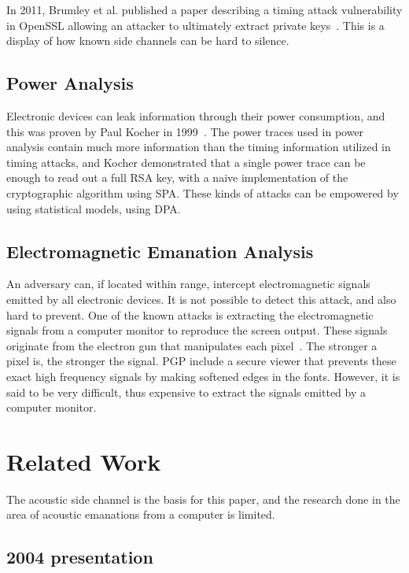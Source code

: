 In 2011, Brumley et al. published a paper describing a timing attack vulnerability in OpenSSL allowing an attacker to ultimately extract private keys~\cite{DBLP:conf/esorics/BrumleyT11}.
This is a display of how known side channels can be hard to silence.


\subsection{Power Analysis}\label{chp2:subsec:power_analysis}
Electronic devices can leak information through their power consumption, and this was proven by Paul Kocher in 1999~\cite{DBLP:conf/crypto/KocherJJ99}.
The power traces used in power analysis contain much more information than the timing information utilized in timing attacks, and Kocher demonstrated that a single power trace can be enough to read out a full RSA key, with a naive implementation of the cryptographic algorithm using \gls{SPA}.
These kinds of attacks can be empowered by using statistical models, using \gls{DPA}.


\subsection{Electromagnetic Emanation Analysis}\label{chp2:subsec:electromagnetic_attacks}
An adversary can, if located within range, intercept electromagnetic signals emitted by all electronic devices. 
It is not possible to detect this attack, and also hard to prevent. 
One of the known attacks is extracting the electromagnetic signals from a computer monitor to reproduce the screen output.
These signals originate from the electron gun that manipulates each pixel~\cite{url:tempest_sans}. 
The stronger a pixel is, the stronger the signal.
PGP include a secure viewer that prevents these exact high frequency signals by making softened edges in the fonts.
However, it is said to be very difficult, thus expensive to extract the signals emitted by a computer monitor. 


\section{Related Work}\label{chp2:sec:related_work}
The acoustic side channel is the basis for this paper, and the research done in the area of acoustic emanations from a computer is limited.

\subsection{2004 presentation}

